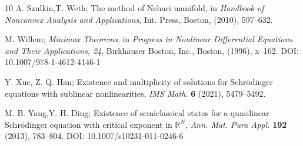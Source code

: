 \documentclass[reqno]{amsart}
\begin{document}
\begin{thebibliography}{10}
 A. Szulkin,T. Weth;
The method of Nehari manifold, in \emph{Handbook of Nonconvex Analysis and Applications}, 
Int. Press, Boston, (2010), 597–632. 

 M. Willem;
\emph{Minimax Theorems}, in \emph{Progress in Nonlinear Differential Equations and Their Applications, 24}, 
Birkhäuser Boston, Inc., Boston, (1996), x--162. DOI: 10.1007/978-1-4612-4146-1

 Y. Xue, Z. Q. Han;
 Existence and multiplicity of solutions for Schr\"odinger equations with sublinear nonlinearities, 
 \emph{IMS Math.} \textbf{6} (2021), 5479--5492.

 M. B. Yang,Y. H. Ding;
Existence of semiclassical states for a quasilinear Schr\"odinger equation with critical 
exponent in ${\mathbb{R}^N}$, 
\emph{Ann. Mat. Pura Appl.} \textbf{192} (2013), 783--804. DOI: 10.1007/s10231-011-0246-6

\end{thebibliography}
\end{document}
